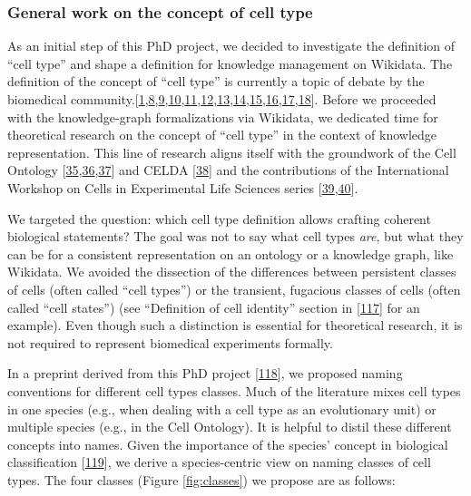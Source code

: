 \hypertarget{general-work-on-the-concept-of-cell-type}{%
\subsubsection{General work on the concept of cell type}\label{general-work-on-the-concept-of-cell-type}}

As an initial step of this PhD project, we decided to investigate the definition of ``cell type'' and shape a definition for knowledge management on Wikidata.
The definition of the concept of ``cell type'' is currently a topic of debate by the biomedical community.{[}\protect\hyperlink{ref-pNGap1Du}{1},\protect\hyperlink{ref-paKiKTRS}{8},\protect\hyperlink{ref-sWv3okaH}{9},\protect\hyperlink{ref-19yYJWEkz}{10},\protect\hyperlink{ref-BlxFp1v3}{11},\protect\hyperlink{ref-eOUB1Bmj}{12},\protect\hyperlink{ref-TupzTvtA}{13},\protect\hyperlink{ref-w0Woz7JE}{14},\protect\hyperlink{ref-srfuRMe}{15},\protect\hyperlink{ref-1GXQByEaQ}{16},\protect\hyperlink{ref-k0Pe9YOB}{17},\protect\hyperlink{ref-MoaYZAA0}{18}{]}.
Before we proceeded with the knowledge-graph formalizations via Wikidata, we dedicated time for theoretical research on the concept of ``cell type'' in the context of knowledge representation.
This line of research aligns itself with the groundwork of the Cell Ontology {[}\protect\hyperlink{ref-1CI8uS6ka}{35},\protect\hyperlink{ref-gAysgnsS}{36},\protect\hyperlink{ref-17U3pGEjv}{37}{]} and CELDA {[}\protect\hyperlink{ref-RLHsA1U8}{38}{]} and the contributions of the International Workshop on Cells in Experimental Life Sciences series {[}\protect\hyperlink{ref-jX2ZmXcc}{39},\protect\hyperlink{ref-rK8KD0us}{40}{]}.

We targeted the question: which cell type definition allows crafting coherent biological statements?
The goal was not to say what cell types \emph{are}, but what they can be for a consistent representation on an ontology or a knowledge graph, like Wikidata.
We avoided the dissection of the differences between persistent classes of cells (often called ``cell types'') or the transient, fugacious classes of cells (often called ``cell states'') (see ``Definition of cell identity'' section in {[}\protect\hyperlink{ref-pFijpXkl}{117}{]} for an example).
Even though such a distinction is essential for theoretical research, it is not required to represent biomedical experiments formally.

In a preprint derived from this PhD project {[}\protect\hyperlink{ref-uCE45Jh8}{118}{]}, we proposed naming conventions for different cell types classes.
Much of the literature mixes cell types in one species (e.g., when dealing with a cell type as an evolutionary unit) or multiple species (e.g., in the Cell Ontology).
It is helpful to distil these different concepts into names. Given the importance of the species' concept in biological classification {[}\protect\hyperlink{ref-AHGRV6KQ}{119}{]}, we derive a species-centric view on naming classes of cell types.
The four classes (Figure \ref{fig:classes}) we propose are as follows:

